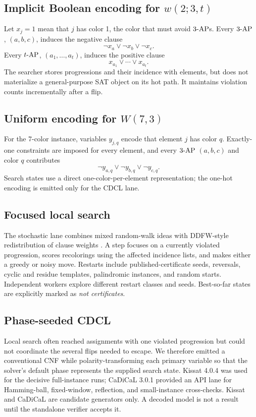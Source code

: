\documentclass[11pt]{article}
\newcommand{\ap}{\textnormal{-AP}}
\begin{document}
\subsection{Implicit Boolean encoding for
\texorpdfstring{\(w(2;3,t)\)}{w(2;3,t)}}

Let \(x_j=1\) mean that \(j\) has color 1, the color that must avoid
\(3\ap\)s.  Every \(3\ap\), \((a,b,c)\), induces the negative clause
\[
  \lnot x_a\lor\lnot x_b\lor\lnot x_c.
\]
Every \(t\ap\), \((a_1,\ldots,a_t)\), induces the positive clause
\[
  x_{a_1}\lor\cdots\lor x_{a_t}.
\]
The searcher stores progressions and their incidence with elements, but does
not materialize a general-purpose SAT object on its hot path.  It maintains
violation counts incrementally after a flip.

\subsection{Uniform encoding for
\texorpdfstring{\(W(7,3)\)}{W(7,3)}}

For the 7-color instance, variables \(y_{j,q}\) encode that element \(j\)
has color \(q\).  Exactly-one constraints are imposed for every element,
and every \(3\ap\) \((a,b,c)\) and color \(q\) contributes
\[
  \lnot y_{a,q}\lor\lnot y_{b,q}\lor\lnot y_{c,q}.
\]
Search states use a direct one-color-per-element representation; the
one-hot encoding is emitted only for the CDCL lane.

\subsection{Focused local search}

The stochastic lane combines mixed random-walk ideas
\cite{selman1994} with DDFW-style redistribution of clause weights
\cite{ishtaiwi2005}.  A step focuses on a currently violated progression,
scores recolorings using the affected incidence lists, and makes either a
greedy or noisy move.  Restarts include published-certificate seeds,
reversals, cyclic and residue templates, palindromic instances, and random
starts.  Independent workers explore different restart classes and seeds.
Best-so-far states are explicitly marked as \emph{not certificates}.

\subsection{Phase-seeded CDCL}

Local search often reached assignments with one violated progression but
could not coordinate the several flips needed to escape.  We therefore
emitted a conventional CNF while polarity-transforming each primary variable
so that the solver's default phase represents the supplied search state.
Kissat 4.0.4 \cite{kissat2024} was used for the decisive full-instance runs;
CaDiCaL 3.0.1 \cite{biere2024} provided an API lane for Hamming-ball, fixed-window,
reflection, and small-instance cross-checks.  Kissat and CaDiCaL are
candidate generators only.  A decoded model is not a result until the
standalone verifier accepts it.
\end{document}

